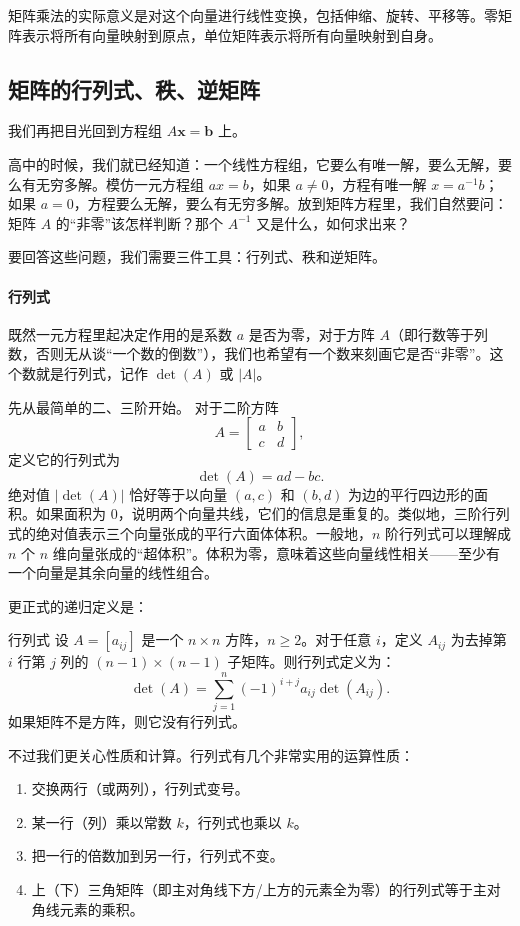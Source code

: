 矩阵乘法的实际意义是对这个向量进行线性变换，包括伸缩、旋转、平移等。零矩阵表示将所有向量映射到原点，单位矩阵表示将所有向量映射到自身。

\subsection{矩阵的行列式、秩、逆矩阵}

我们再把目光回到方程组 \(A \mathbf{x} = \mathbf{b}\) 上。

高中的时候，我们就已经知道：一个线性方程组，它要么有唯一解，要么无解，要么有无穷多解。模仿一元方程组 \(ax = b\)，如果 \(a \neq 0\)，方程有唯一解 \(x = a^{-1}b\)；如果 \(a = 0\)，方程要么无解，要么有无穷多解。放到矩阵方程里，我们自然要问：矩阵 \(A\) 的“非零”该怎样判断？那个 \(A^{-1}\) 又是什么，如何求出来？

要回答这些问题，我们需要三件工具：行列式、秩和逆矩阵。

\paragraph{行列式}

既然一元方程里起决定作用的是系数 \(a\) 是否为零，对于方阵 \(A\)（即行数等于列数，否则无从谈“一个数的倒数”），我们也希望有一个数来刻画它是否“非零”。这个数就是行列式，记作 \(\det(A)\) 或 \(|A|\)。

先从最简单的二、三阶开始。
对于二阶方阵
\[
    A =
    \begin{bmatrix}
        a & b \\ c & d
    \end{bmatrix},
\]
定义它的行列式为
\[
    \det(A) = ad - bc .
\]
绝对值 \(|\det(A)|\) 恰好等于以向量 \((a,c)\) 和 \((b,d)\) 为边的平行四边形的面积。如果面积为 \(0\)，说明两个向量共线，它们的信息是重复的。类似地，三阶行列式的绝对值表示三个向量张成的平行六面体体积。一般地，\(n\) 阶行列式可以理解成 \(n\) 个 \(n\) 维向量张成的“超体积”。体积为零，意味着这些向量线性相关——至少有一个向量是其余向量的线性组合。

更正式的递归定义是：
\begin{definition}{行列式}{}
    设 \(A = [a_{ij}]\) 是一个 \(n \times n\) 方阵，\(n \ge 2\)。对于任意 \(i\)，定义 \(A_{ij}\) 为去掉第 \(i\) 行第 \(j\) 列的 \((n-1) \times (n-1)\) 子矩阵。则行列式定义为：
    \[
        \det(A) = \sum_{j=1}^{n} (-1)^{i+j} a_{ij} \det(A_{ij}) .
    \]
    如果矩阵不是方阵，则它没有行列式。
\end{definition}

不过我们更关心性质和计算。行列式有几个非常实用的运算性质：
\begin{enumerate}
    \item 交换两行（或两列），行列式变号。
    \item 某一行（列）乘以常数 \(k\)，行列式也乘以 \(k\)。
    \item 把一行的倍数加到另一行，行列式不变。
    \item 上（下）三角矩阵（即主对角线下方/上方的元素全为零）的行列式等于主对角线元素的乘积。
\end{enumerate}

